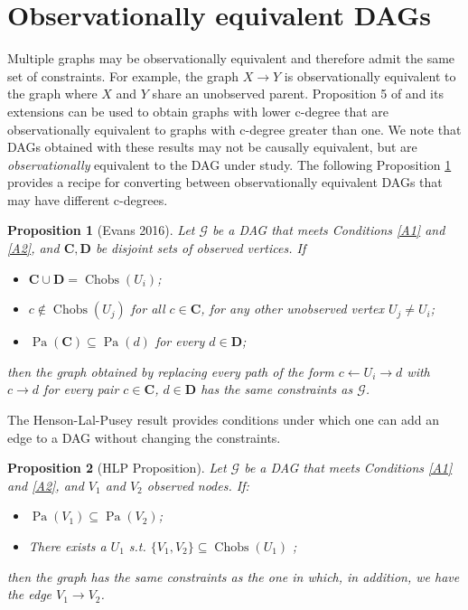 \documentclass[12pt]{article}
\newtheorem{proposition}{Proposition}
\DeclareMathOperator{\Chobs}{Chobs}
\DeclareMathOperator{\Pa}{Pa}
\begin{document}
\section{Observationally equivalent DAGs} \label{graphmod}
Multiple graphs may be observationally equivalent and therefore admit the same set of constraints. For example, the graph $X \rightarrow Y$ is observationally equivalent to the graph where $X$ and $Y$ share an unobserved parent.
Proposition 5 of \citet{evans2016graphs} and its extensions \citep{ansanelli2025observationalpartialordercausal} can be used to obtain graphs with lower c-degree that are observationally equivalent to graphs with c-degree greater than one. We note that DAGs obtained with these results may not be causally equivalent, but are \emph{observationally} equivalent to the DAG under study. The following Proposition \ref{prop:replace} provides a recipe for converting between observationally equivalent DAGs that may have different c-degrees. %

\begin{proposition}[Evans 2016] \label{prop:replace}
Let $\mathcal{G}$ be a DAG that meets Conditions \ref{A1} and \ref{A2}, and $\boldsymbol{C}, \boldsymbol{D}$ be disjoint sets of observed vertices. If 
\begin{itemize}
    \item $\boldsymbol{C} \cup \boldsymbol{D} = \Chobs(U_i)$; 
    \item $c \notin \Chobs(U_j)$ for all $c \in \boldsymbol{C}$, for any other unobserved vertex $U_j \neq U_i$;
    \item $\Pa(\boldsymbol{C}) \subseteq\Pa(d)$ for every $d \in \boldsymbol{D}$;
\end{itemize}
then the graph obtained by replacing every path of the form $c \leftarrow U_i \rightarrow d$ with $c \rightarrow d$ for every pair $c \in \boldsymbol{C}$, $d \in \boldsymbol{D}$ has the same constraints as $\mathcal{G}$.

\end{proposition}

The Henson-Lal-Pusey \citep{henson2014theory} result provides conditions under which one can add an edge to a DAG without changing the constraints.

\begin{proposition}[HLP Proposition] \label{prop:hlp}
  Let $\mathcal{G}$ be a DAG that meets Conditions \ref{A1} and \ref{A2}, and $V_1$ and $V_2$ observed nodes.  
  If: 
  \begin{itemize}
      \item $\Pa(V_1) \subseteq \Pa(V_2)$;
      \item There exists a $U_1$ s.t. $\{V_1, V_2\} \subseteq \Chobs(U_1)$ ;
  \end{itemize}
  then the graph has the same constraints as the one in which, in addition, we have the edge $V_1 \to V_2$.
\end{proposition}
\end{document}
